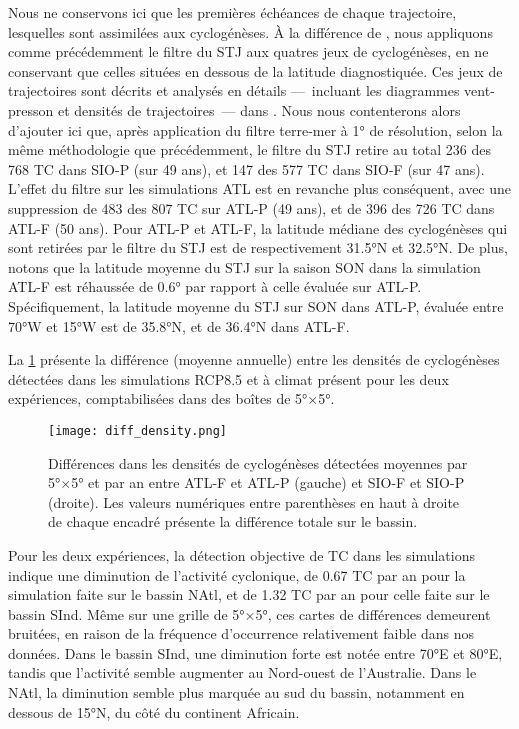 \documentclass[../main.tex]{subfiles}
\begin{document}
Nous ne conservons ici que les premières échéances de chaque trajectoire, lesquelles sont assimilées aux cyclogénèses. À la différence de
\textcite{cattiaux_projected_2020,chauvin_future_2020}, nous appliquons comme précédemment le filtre du STJ aux quatres jeux de cyclogénèses, en ne conservant
que celles situées en dessous de la latitude diagnostiquée. Ces jeux de trajectoires sont décrits et analysés en détails ---~incluant les diagrammes
vent-presson et densités de trajectoires~--- dans \textcite{cattiaux_projected_2020,chauvin_future_2020}. Nous nous contenterons alors d'ajouter ici que, après
application du filtre terre-mer à \ang{1} de résolution, selon la même méthodologie que précédemment, le filtre du STJ retire au total \num{236} des \num{768}
TC dans SIO-P (sur 49 ans), et \num{147} des \num{577} TC dans SIO-F (sur 47 ans). L'effet du filtre sur les simulations ATL est en revanche plus conséquent,
avec une suppression de \num{483} des \num{807} TC sur ATL-P (49 ans), et de \num{396} des \num{726} TC dans ATL-F (50 ans). Pour ATL-P et ATL-F, la latitude
médiane des cyclogénèses qui sont retirées par le filtre du STJ est de respectivement \ang{31.5}N et \ang{32.5}N. De plus, notons que la latitude moyenne du STJ
sur la saison SON dans la simulation ATL-F est réhaussée de \ang{0.6} par rapport à celle évaluée sur ATL-P. Spécifiquement, la latitude moyenne du STJ sur SON
dans ATL-P, évaluée entre \ang{70}W et \ang{15}W est de \ang{35.8}N, et de \ang{36.4}N dans ATL-F.

La \cref{fig:diff_track} présente la différence (moyenne annuelle) entre les densités de cyclogénèses détectées dans les simulations RCP8.5 et à climat présent
pour les deux expériences, comptabilisées dans des boîtes de \ang{5}$\times$\ang{5}.

\begin{figure}[htpb]
    \centering
    \texttt{[image: diff\_density.png]}
    \caption{Différences dans les densités de cyclogénèses détectées moyennes par \ang{5}$\times$\ang{5} et par an entre ATL-F et ATL-P (gauche) et SIO-F et
    SIO-P (droite). Les valeurs numériques entre parenthèses en haut à droite de chaque encadré présente la différence totale sur le bassin.}
    \label{fig:diff_track}
\end{figure}

Pour les deux expériences, la détection objective de TC dans les simulations indique une diminution de l'activité cyclonique, de \num{0.67} TC par an pour la
simulation faite sur le bassin NAtl, et de \num{1.32} TC par an pour celle faite sur le bassin SInd. Même sur une grille de \ang{5}$\times$\ang{5}, ces cartes
de différences demeurent bruitées, en raison de la fréquence d'occurrence relativement faible dans nos données. Dans le bassin SInd, une diminution forte est
notée entre \ang{70}E et \ang{80}E, tandis que l'activité semble augmenter au Nord-ouest de l'Australie. Dans le NAtl, la diminution semble plus marquée au sud du
bassin, notamment en dessous de \ang{15}N, du côté du continent Africain.
\end{document}
